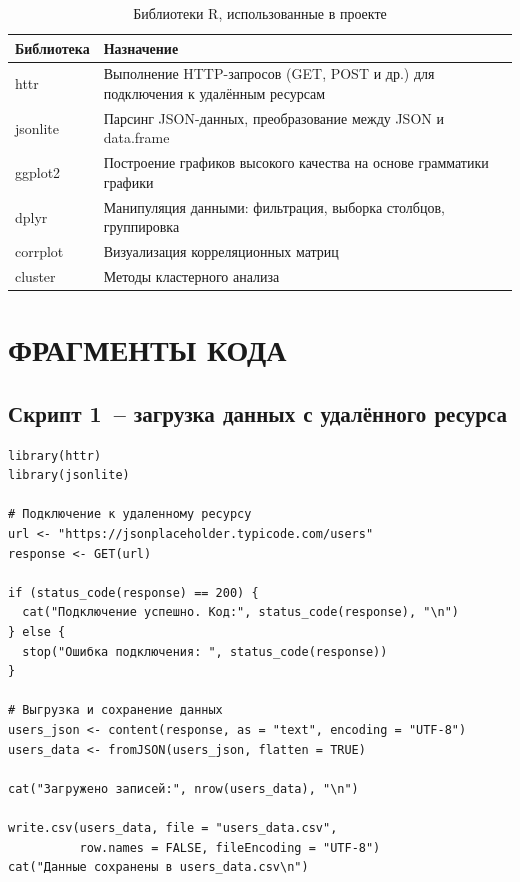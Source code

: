\documentclass[14pt,a4paper]{extarticle}
\begin{document}
\begin{table}[H]
\caption{Библиотеки R, использованные в проекте}
\label{tab:libs}
\begin{tabularx}{\textwidth}{|l|X|}
\hline
\textbf{Библиотека} & \textbf{Назначение} \\
\hline
httr & Выполнение HTTP-запросов (GET, POST и др.) для подключения к удалённым ресурсам \\
\hline
jsonlite & Парсинг JSON-данных, преобразование между JSON и data.frame \\
\hline
ggplot2 & Построение графиков высокого качества на основе грамматики графики \\
\hline
dplyr & Манипуляция данными: фильтрация, выборка столбцов, группировка \\
\hline
corrplot & Визуализация корреляционных матриц \\
\hline
cluster & Методы кластерного анализа \\
\hline
\end{tabularx}
\end{table}

\newpage

\section{ФРАГМЕНТЫ КОДА}

\subsection{Скрипт 1~-- загрузка данных с удалённого ресурса}

\begin{lstlisting}[caption={Скрипт lab2\_script1.R}, label=lst:script1]
library(httr)
library(jsonlite)

# Подключение к удаленному ресурсу
url <- "https://jsonplaceholder.typicode.com/users"
response <- GET(url)

if (status_code(response) == 200) {
  cat("Подключение успешно. Код:", status_code(response), "\n")
} else {
  stop("Ошибка подключения: ", status_code(response))
}

# Выгрузка и сохранение данных
users_json <- content(response, as = "text", encoding = "UTF-8")
users_data <- fromJSON(users_json, flatten = TRUE)

cat("Загружено записей:", nrow(users_data), "\n")

write.csv(users_data, file = "users_data.csv",
          row.names = FALSE, fileEncoding = "UTF-8")
cat("Данные сохранены в users_data.csv\n")
\end{lstlisting}
\end{document}
